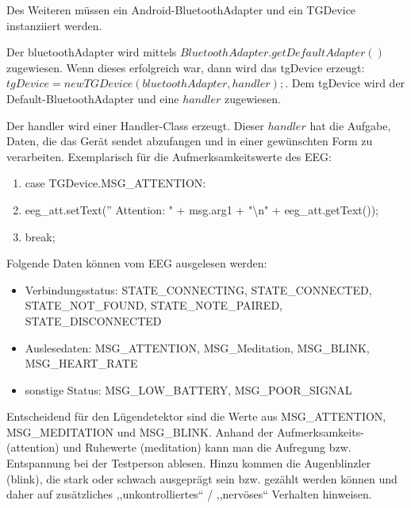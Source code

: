 \documentclass[10pt, a4paper, oneside, titlepage]{scrartcl} %
\begin{document}
	Des Weiteren müssen ein Android-BluetoothAdapter und ein TGDevice instanziiert werden.

	Der bluetoothAdapter wird mittels $BluetoothAdapter.getDefaultAdapter()$ zugewiesen. Wenn dieses erfolgreich war, dann wird das tgDevice erzeugt: $tgDevice = new TGDevice(bluetoothAdapter, handler);$. Dem tgDevice wird der Default-BluetoothAdapter und eine $handler$ zugewiesen. 
	
	Der handler \label{handler} wird einer Handler-Class erzeugt. Dieser $handler$ hat die Aufgabe, Daten, die das Gerät sendet abzufangen und in einer gewünschten Form zu verarbeiten. Exemplarisch für die Aufmerksamkeitswerte des EEG:
	
	\begin{enumerate}
	\item case TGDevice.MSG\_ATTENTION:
    \item eeg\_att.setText('' Attention: " + msg.arg1 + "\textbackslash n" + eeg\_att.getText());
	\item break;
	\end{enumerate}
	
	Folgende Daten können vom EEG ausgelesen werden:
	
	\begin{itemize}
	\item Verbindungsstatus: STATE\_CONNECTING, STATE\_CONNECTED, \\STATE\_NOT\_FOUND, STATE\_NOTE\_PAIRED, STATE\_DISCONNECTED
	\item Auslesedaten: MSG\_ATTENTION, MSG\_Meditation, MSG\_BLINK, \\MSG\_HEART\_RATE
	\item sonstige Status: MSG\_LOW\_BATTERY, MSG\_POOR\_SIGNAL
	\end{itemize}
	
	Entscheidend für den Lügendetektor sind die Werte aus MSG\_ATTENTION, \\MSG\_MEDITATION und MSG\_BLINK. Anhand der Aufmerksamkeits- (attention) und Ruhewerte (meditation) kann man die Aufregung bzw. Entspannung bei der Testperson ablesen. Hinzu kommen die Augenblinzler (blink), die stark oder schwach ausgeprägt sein bzw. gezählt werden können und daher auf zusätzliches ,,unkontrolliertes`` / ,,nervöses`` Verhalten hinweisen.
	
\end{document}
